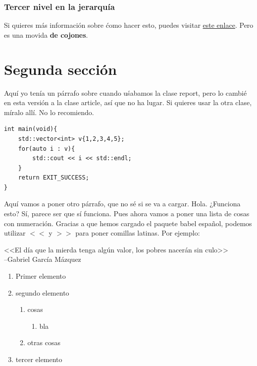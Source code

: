 \documentclass{article}
\begin{document}
\subsubsection{Tercer nivel en la jerarquía}
Si quieres más información sobre ćomo hacer esto, puedes visitar
\href{https://ctan.org/pkg/titlesec}{este enlace}.
Pero es una movida \textbf{de cojones}.
\section{Segunda sección}
Aquí yo tenía un párrafo sobre cuando uśabamos la clase report, pero lo cambié
en esta versión a la clase article, así que no ha lugar. Si quieres usar la 
otra clase, míralo allí. No lo recomiendo.
\begin{verbatim} 
int main(void){
    std::vector<int> v{1,2,3,4,5};
    for(auto i : v){
        std::cout << i << std::endl;
    }
    return EXIT_SUCCESS;
}
\end{verbatim}
Aquí vamos a poner otro párrafo, que no sé si se va a cargar. Hola. ¿Funciona
esto? Sí, parece ser que sí funciona. Pues ahora vamos a poner una lista de
cosas con numeración. Gracias a que hemos cargado el paquete babel español,
podemos utilizar $<<$ y $>>$ para poner comillas latinas. Por ejemplo:

<<El día que la mierda tenga algún valor, los pobres nacerán sin culo>> \\
--Gabriel García Mázquez

\begin{enumerate}
\item Primer elemento
    \item segundo elemento
        \begin{enumerate} %
            \item cosas
                \begin{enumerate}
                    \item bla
                \end{enumerate}
            \item otras cosas
        \end{enumerate}
    \item tercer elemento
\end{enumerate}
\end{document}
